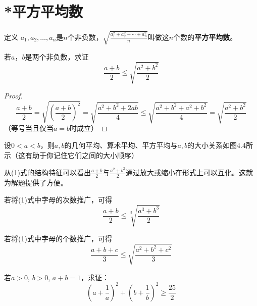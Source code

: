 \section{*平方平均数}
\begin{thm}{定义}
  $a_1,a_2,\ldots , a_n$是$n$个非负数，$\sqrt{\frac{a^2_1+a^2_2+\cdots+a^2_n}{n}}$叫做这$n$个数的\textbf{平方平均数}。
\end{thm}

\begin{example}
    若$a$，$b$是两个非负数，求证
    \begin{equation}
        \frac{a+b}{2}\le \sqrt{\frac{a^2+b^2}{2}}\tag{1}
    \end{equation}
\end{example}

\begin{proof}
\[\frac{a+b}{2}=\sqrt{\left(\frac{a+b}{2}\right)^2}=\sqrt{\frac{a^2+b^2+2ab}{4}}\le \sqrt{\frac{a^2+b^2+a^2+b^2}{4}}=\sqrt{\frac{a^2+b^2}{2}}\]
（等号当且仅当$a=b$时成立）
\end{proof}

设$0<a<b$，则$a,b$的几何平均、算术平均、平方平均与$a,b$的大小关系如图4.4所示（这有助于你记住它们之间的大小顺序）
\begin{figure}[htp]
    \centering
{}
    \caption{}
\end{figure}

从(1)式的结构特征可以看出$\frac{a+b}{2}$与$\frac{a^2+b^2}{2}$通过放大或缩小在形式上可以互化。这就为解题提供了方便。

若将(1)式中字母的次数推广，可得
\begin{equation}
    \frac{a+b}{2}\le \sqrt[3]{\frac{a^3+b^3}{2}} \tag{2}
\end{equation}

若将(1)式中字母的个数推广，可得
\begin{equation}
    \frac{a+b+c}{3}\le \sqrt{\frac{a^2+b^2+c^2}{3}}\tag{3}
\end{equation}

\begin{example}
若$a>0$, $b>0$, $a+b=1$，求证：
\begin{equation}
    \left(a+\frac{1}{a}\right)^2 +
    \left(b+\frac{1}{b}\right)^2 \ge \frac{25}{2}
\end{equation}
\end{example}


